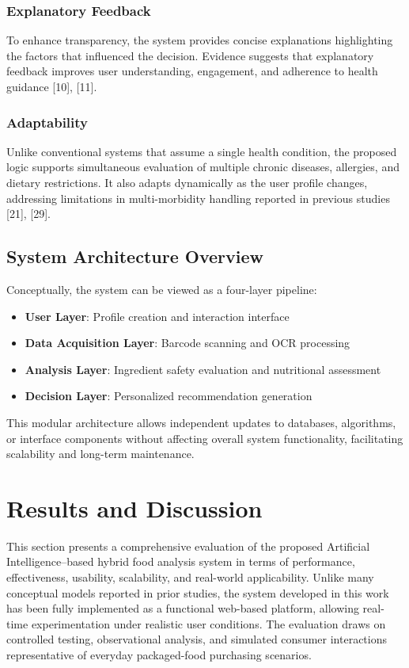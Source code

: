 \documentclass[conference]{IEEEtran}
\begin{document}
\subsubsection{Explanatory Feedback}

To enhance transparency, the system provides concise explanations highlighting the factors that influenced the decision. Evidence suggests that explanatory feedback improves user understanding, engagement, and adherence to health guidance [10], [11].

\subsubsection{Adaptability}

Unlike conventional systems that assume a single health condition, the proposed logic supports simultaneous evaluation of multiple chronic diseases, allergies, and dietary restrictions. It also adapts dynamically as the user profile changes, addressing limitations in multi-morbidity handling reported in previous studies [21], [29].

\subsection{System Architecture Overview}

Conceptually, the system can be viewed as a four-layer pipeline:

\begin{itemize}
    \item \textbf{User Layer}: Profile creation and interaction interface
    \item \textbf{Data Acquisition Layer}: Barcode scanning and OCR processing
    \item \textbf{Analysis Layer}: Ingredient safety evaluation and nutritional assessment
    \item \textbf{Decision Layer}: Personalized recommendation generation
\end{itemize}

This modular architecture allows independent updates to databases, algorithms, or interface components without affecting overall system functionality, facilitating scalability and long-term maintenance.

\section{Results and Discussion}

This section presents a comprehensive evaluation of the proposed Artificial Intelligence–based hybrid food analysis system in terms of performance, effectiveness, usability, scalability, and real-world applicability. Unlike many conceptual models reported in prior studies, the system developed in this work has been fully implemented as a functional web-based platform, allowing real-time experimentation under realistic user conditions. The evaluation draws on controlled testing, observational analysis, and simulated consumer interactions representative of everyday packaged-food purchasing scenarios.
\end{document}
